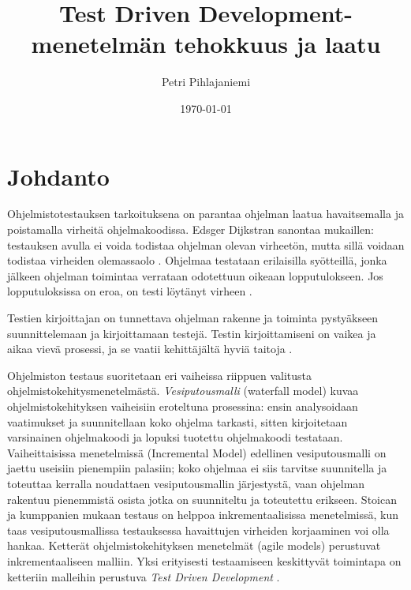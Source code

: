 \documentclass[finnish]{tktltiki2}
\title{Test Driven Development- menetelmän tehokkuus ja laatu}
\author{Petri Pihlajaniemi}
\date{\today}
\theoremstyle{definition}
\theoremstyle{remark}
\begin{document}


\maketitle        %
\makeabstract     %

\tableofcontents  %


\mainmatter       %




\section{Johdanto}


Ohjelmistotestauksen tarkoituksena on parantaa ohjelman laatua havaitsemalla ja poistamalla virheitä ohjelmakoodissa. Edsger Dijkstran sanontaa mukaillen: testauksen avulla ei voida todistaa ohjelman olevan virheetön, mutta sillä voidaan todistaa virheiden olemassaolo \cite{Randell69}. Ohjelmaa testataan erilaisilla syötteillä, jonka jälkeen ohjelman toimintaa verrataan odotettuun oikeaan lopputulokseen. Jos lopputuloksissa on eroa, on testi löytänyt virheen \cite{Muccini08}.


Testien kirjoittajan on tunnettava ohjelman rakenne ja toiminta pystyäkseen suunnittelemaan ja kirjoittamaan testejä. Testin kirjoittamiseni on vaikea ja aikaa vievä prosessi, ja se vaatii kehittäjältä hyviä taitoja \cite{Whittaker00}.

Ohjelmiston testaus suoritetaan eri vaiheissa riippuen valitusta ohjelmistokehitysmenetelmästä. \emph{Vesiputousmalli} (waterfall model) kuvaa ohjelmistokehityksen vaiheisiin eroteltuna prosessina: ensin analysoidaan vaatimukset ja suunnitellaan koko ohjelma tarkasti, sitten kirjoitetaan varsinainen ohjelmakoodi ja lopuksi tuotettu ohjelmakoodi testataan. Vaiheittaisissa menetelmissä (Incremental Model) edellinen vesiputousmalli on jaettu useisiin pienempiin palasiin; koko ohjelmaa ei siis tarvitse suunnitella ja toteuttaa kerralla noudattaen vesiputousmallin järjestystä, vaan ohjelman rakentuu pienemmistä osista jotka on suunniteltu ja toteutettu erikseen. Stoican ja kumppanien \cite{Stoica13}  mukaan testaus on helppoa inkrementaalisissa menetelmissä, kun taas vesiputousmallissa testauksessa havaittujen virheiden korjaaminen voi olla hankaa. Ketterät  ohjelmistokehityksen menetelmät (agile models) perustuvat inkrementaaliseen malliin. Yksi erityisesti testaamiseen keskittyvät toimintapa on ketteriin malleihin perustuva \emph{Test Driven Development} \cite{Crispin06}.
\end{document}
